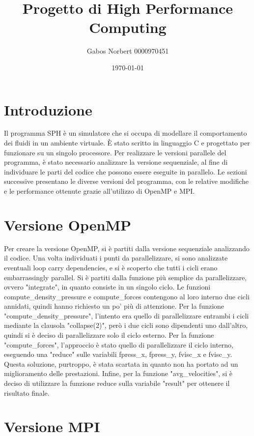 \documentclass[a4paper,12pt, oneside]{article}
\title{Progetto di High Performance Computing}
\author{Gabos Norbert 0000970451}
\date{\today}
\begin{document}
\maketitle

\section{Introduzione}

Il programma SPH è un simulatore che si occupa di modellare il comportamento dei fluidi in un
ambiente virtuale. È stato scritto in linguaggio C e progettato per funzionare su un singolo
processore. Per realizzare le versioni parallele del programma, è stato necessario analizzare
la versione sequenziale, al fine di individuare le parti del codice che possono essere eseguite
in parallelo. Le sezioni successive presentano le diverse versioni del programma, con le
relative modifiche e le performance ottenute grazie all'utilizzo di OpenMP e MPI.

\section{Versione OpenMP}

Per creare la versione OpenMP, si è partiti dalla versione sequenziale analizzando il codice.
Una volta individuati i punti da parallelizzare, si sono analizzate eventuali loop carry
dependencies, e si è scoperto che tutti i cicli erano embarrassingly parallel. Si è partiti
dalla funzione più semplice da parallelizzare, ovvero "integrate", in quanto consiste in un
singolo ciclo. Le funzioni compute\_density\_pressure e compute\_forces contengono al loro
interno due cicli annidati, quindi hanno richiesto un po' più di attenzione.
Per la funzione "compute\_density\_pressure", l'intento era quello di parallelizzare entrambi
i cicli mediante la clausola "collapse(2)", però i due cicli sono dipendenti uno dall'altro,
quindi si è deciso di parallelizzare solo il ciclo esterno. Per la funzione "compute\_forces",
l'approccio è stato quello di parallelizzare il ciclo interno, eseguendo una "reduce" sulle
variabili fpress\_x, fpress\_y, fvisc\_x e fvisc\_y. Questa soluzione, purtroppo, è stata
scartata in quanto non ha portato ad un miglioramento delle prestazioni.
Infine, per la funzione "avg\_velocities", si è deciso di utilizzare la funzione reduce sulla
variabile "result" per ottenere il risultato finale.

\section{Versione MPI}
\end{document}
